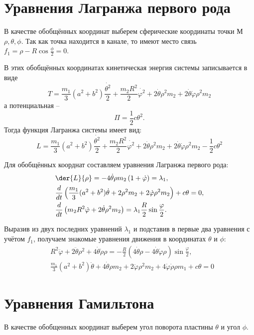 \section{Уравнения Лагранжа первого рода}
    В качестве обобщённых координат выберем сферические координаты точки
    \( М \) \( \rho, \theta, \phi \). Так как точка находится в
    канале, то имеют место связь \( f_1 = \rho - R\cos\frac{\phi}{2} = 0 \).

    В этих обобщённых координатах кинетическая энергия системы записывается в
    виде
    \[
        T = \frac{m_1}{3}(a^2+b^2)\frac{\dot{\theta^2}}{2} 
        + \frac{m_2 R^2}{2}\dot{\varphi^2} + 2\dot{\theta}\rho^{2} m_2
        + 2\dot{\theta}\dot{\varphi}\rho^2 m_2
    \]
    а потенциальная --
    \[
        \varPi = \frac{1}{2}c\theta^2.
    \]
    Тогда функция Лагранжа системы имеет вид:
    \[
        L = \frac{m_1}{3}(a^2+b^2)\frac{\dot{\theta^2}}{2} 
        + \frac{m_2 R^2}{2}\dot{\varphi^2} + 2\dot{\theta}\rho^2 m_2
        + 2\dot{\theta}\dot{\varphi}\rho^2 m_2 - \frac{1}{2}c\theta^2
    \]

    Для обобщённых коорднат составляем уравнения Лагранжа первого рода:
    \begin{align*}
        & \der{L}{\rho} = -4\dot{\theta}\rho m_2 \left( 1 + \dot{\varphi}\right) 
        = \lambda_1, \\
        & \frac{d}{dt}\left( \frac{m_1}{3}(a^2+b^2)\dot{\theta}
        + 2\rho^{2} m_2 + 2\dot{\varphi}\rho^2 m_2 \right) + c\theta = 0, \\
        & \frac{d}{dt}\left( m_2 R^2 \dot{\varphi} + 2\dot{\theta}\rho^2 m_2 \right) 
        = \lambda_1 \frac{R}{2} \sin\frac{\varphi}{2}.
    \end{align*}

    Выразив из двух последних уравнений \( \lambda_1 \) и
    подставив в первые два уравнения с учётом \( f_1 \), получаем
    знакомые уравнения движения в координатах \( \theta \) и \( \phi \):
    \begin{align*}
        & R^2 \ddot{\varphi} + 2\ddot{\theta}\rho^2 + 4\dot{\theta}\dot{\rho}\rho = 
        - \frac{R}{2}\left( 4\dot{\theta}\rho - 4\dot{\theta}\dot{\varphi}\rho \right)\sin\frac{\varphi}{2}, \\
        & \frac{m_1}{3}(a^2+b^2)\ddot{\theta} + 4\dot{\theta}\rho m_2 + 2\ddot{\varphi}\rho^2 m_2
        + 4\dot{\varphi}\dot{\rho}\rho m_1 + c\theta = 0
    \end{align*}

\section{Уравнения Гамильтона}
    В качестве обобщенных координат выберем угол поворота пластины \( \theta \)
    и угол \(\phi \).
    
